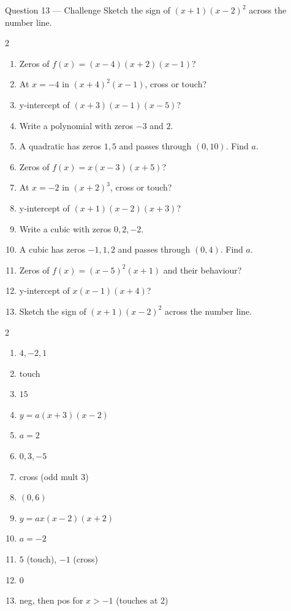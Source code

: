 \documentclass[11pt]{article}
\begin{document}
\begin{qbox}{Question 13 --- Challenge}
Sketch the sign of $(x+1)(x-2)^2$ across the number line.\workspace{3cm}
\end{qbox}

\clearpage
{}

\begin{recapbox}
\begin{multicols}{2}
\small
\begin{enumerate}[leftmargin=*,itemsep=3pt]
  \item Zeros of $f(x)=(x-4)(x+2)(x-1)$?
  \item At $x=-4$ in $(x+4)^2(x-1)$, cross or touch?
  \item y-intercept of $(x+3)(x-1)(x-5)$?
  \item Write a polynomial with zeros $-3$ and $2$.
  \item A quadratic has zeros $1,5$ and passes through $(0,10)$. Find $a$.
  \item Zeros of $f(x)=x(x-3)(x+5)$?
  \item At $x=-2$ in $(x+2)^3$, cross or touch?
  \item y-intercept of $(x+1)(x-2)(x+3)$?
  \item Write a cubic with zeros $0,2,-2$.
  \item A cubic has zeros $-1,1,2$ and passes through $(0,4)$. Find $a$.
  \item Zeros of $f(x)=(x-5)^2(x+1)$ and their behaviour?
  \item y-intercept of $x(x-1)(x+4)$?
  \item Sketch the sign of $(x+1)(x-2)^2$ across the number line.
\end{enumerate}
\end{multicols}
\end{recapbox}

\begin{keybox}
\begin{multicols}{2}
\small
\begin{enumerate}[leftmargin=*,itemsep=3pt]
  \item $4,-2,1$
  \item touch
  \item $15$
  \item $y=a(x+3)(x-2)$
  \item $a=2$
  \item $0,3,-5$
  \item cross (odd mult 3)
  \item $(0,6)$
  \item $y=ax(x-2)(x+2)$
  \item $a=-2$
  \item $5$ (touch), $-1$ (cross)
  \item $0$
  \item neg, then pos for $x>-1$ (touches at 2)
\end{enumerate}
\end{multicols}
\end{keybox}
\end{document}

